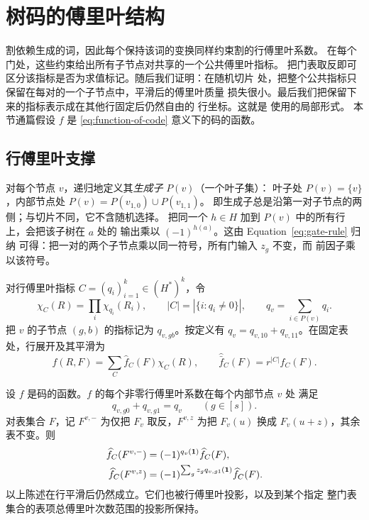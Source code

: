 \section{树码的傅里叶结构}\label{sec:tree-fourier}

割依赖生成的词，因此每个保持该词的变换同样约束割的行傅里叶系数。
在每个门处，这些约束给出所有子节点对共享的一个公共傅里叶指标。
把门表取反即可区分该指标是否为求值标记。随后我们证明：在随机切片
处，把整个公共指标只保留在每对的一个子节点中，平滑后的傅里叶质量
损失很小。最后我们把保留下来的指标表示成在其他行固定后仍然自由的
行坐标。这就是  使用的局部形式。
本节通篇假设 $f$ 是 \eqref{eq:function-of-code} 意义下的码的函数。

\subsection{行傅里叶支撑}

对每个节点 $v$，递归地定义其\emph{生成子} $P(v)$（一个叶子集）：
叶子处 $P(v)=\{v\}$，内部节点处
$P(v)=P(v_{1,0})\cup P(v_{1,1})$。
即生成子总是沿第一对子节点的两侧；与切片不同，它不含随机选择。
把同一个 $h\in H$ 加到 $P(v)$ 中的所有行上，会把该子树在 $a$ 处的
输出乘以 $(-1)^{h(a)}$。这由 Equation~\eqref{eq:gate-rule} 归纳
可得：把一对的两个子节点乘以同一符号，所有门输入 $z_g$ 不变，而
前因子乘以该符号。

对行傅里叶指标 $C=(q_i)_{i=1}^k\in(H^*)^k$，令
\[
 \chi_C(R)=\prod_i\chi_{q_i}(R_i),\qquad
 |C|=|\{i:q_i\ne0\}|,\qquad
 q_v=\sum_{i\in P(v)}q_i.
\]
把 $v$ 的子节点 $(g,b)$ 的指标记为 $q_{v,gb}$。按定义有
$q_v=q_{v,10}+q_{v,11}$。在固定表处，行展开及其平滑为
\begin{equation}
 f(R,F)=\sum_C\widehat f_C(F)\chi_C(R),\qquad
 \widehat{\bar f}_C(F)=r^{|C|}\widehat f_C(F).
 \label{eq:row-smoothing}
\end{equation}

\begin{lemma}[行对称性]
\label{lem:row-symmetry}
设 $f$ 是码的函数。$f$ 的每个非零行傅里叶系数在每个内部节点 $v$ 处
满足
\begin{equation}
 q_{v,g0}+q_{v,g1}=q_v\qquad(g\in[s]).
 \label{eq:row-relations}
\end{equation}
对表集合 $F$，记 $F^{v,-}$ 为仅把 $F_v$ 取反，$F^{v,z}$ 为把
$F_v(u)$ 换成 $F_v(u+z)$，其余表不变。则
\begin{align}
 \widehat f_C(F^{v,-})
   &=(-1)^{q_v(\mathbf 1)}\widehat f_C(F),
   \label{eq:table-flip-action}\\
 \widehat f_C(F^{v,z})
   &=(-1)^{\sum_g z_g q_{v,g1}(\mathbf 1)}\widehat f_C(F).
   \label{eq:table-translation-action}
\end{align}
以上陈述在行平滑后仍然成立。它们也被行傅里叶投影，以及到某个指定
整门表集合的表项总傅里叶次数范围的投影所保持。
\end{lemma}

